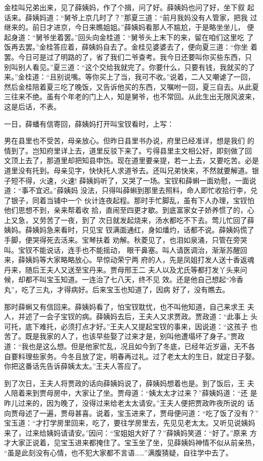 金桂叫兄弟出来，见了薛姨妈，作了个揖，问了好。薛姨妈也问了好，坐下叙
起话来。薛姨妈道：“舅爷上京几时了？”那夏三道：“前月我妈没有人管家，把我
过继来的。前日才进京，今日来瞧姐姐。”薛姨妈看那人不尴尬，于是略坐坐儿，
便起身道：“舅爷坐着罢。”回头向金桂道：“舅爷头上末下的来，留在咱们这里吃
了饭再去罢。”金桂答应着，薛姨妈自去了。金桂见婆婆去了，便向夏三道：“你坐
着罢。今日可是过了明路的了，省了我们二爷查考。我今日还要叫你买些东西，只
别叫别人看见。”夏三道：“这个交给我就完了。你要什么，只要有钱，我就买的了
来。”金桂道：“且别说嘴。等你买上了当，我可不收。”说着，二人又嘲谑了一回，
然后金桂陪着夏三吃了晚饭，又告诉他买的东西，又嘱咐一回，夏三自去。从此夏
三往来不绝。虽有个年老的门上人，知是舅爷，也不常回。从此生出无限风波来，
这是后话，不表。

一日，薛蟠有信寄回，薛姨妈打开叫宝钗看时，上写：

男在县里也不受苦，母亲放心。但昨日县里书办说，府里已经准详，想是我们
的情到了。岂知府里详上去，道里反驳下来了。亏得县里主文相公好，即刻做了回
文顶上去了，那道里却把知县申饬。现在道里要亲提，若一上去，又要吃苦。必是
道里没有托到。母亲见字，快快托人求道爷去。还叫兄弟快来，不然就要解道。银
子短不得，火速，火速!
薛姨妈听了，又哭了一场。宝钗和薛蝌一面劝慰，一面说道：“事不宜迟。”薛姨妈
没法，只得叫薛蝌到那里去照料，命人即忙收拾行李，兑了银子，同着当铺中一个
伙计连夜起程。那时手忙脚乱，虽有下人办理，宝钗怕他们思想不到，亲来帮着收
拾，直闹至四更才歇。到底富家女子娇养惯了的，心上又急，又劳苦了一夜，到了
次日就发起烧来，汤水都吃不下去。莺儿忙回了薛姨妈。薛姨妈急来看时，只见宝
钗满面通红，身如燔灼，话都不说。薛姨妈慌了手脚，便哭得死去活来。宝琴扶着
劝解。秋菱见了，也泪如泉涌，只管在旁哭叫。宝钗不能说话，连手也不能摇动，
眼干鼻塞。叫人请医调治，渐渐苏醒回来，薛姨妈等大家略略放心。早惊动荣宁两
府的人，先是凤姐打发人送十香返魂丹来，随后王夫人又送至宝丹来。贾母邢王二
夫人以及尤氏等都打发丫头来问候，却都不叫宝玉知道。一连治了七八天，终不见
效。还是他自己想起“冷香丸”，吃了三丸，才得病好。后来宝玉也知道了，因病
好了，没有瞧去。

那时薛蝌又有信回来。薛姨妈看了，怕宝钗耽忧，也不叫他知道，自己来求王
夫人，并述了一会子宝钗的病。薛姨妈去后，王夫人又求贾政。贾政道：“此事上
头可托，底下难托，必须打点才好。”王夫人又提起宝钗的事来，因说道：“这孩子
也苦了。既是我家的人了，也该早些娶了过来才是，别叫他遭塌坏了身子。”贾政
道：“我也是这么想。但是他家忙乱，况且如今到了冬底，已经年近岁逼，无不各
自要料理些家务。今冬且放了定，明春再过礼。过了老太太的生日，就定日子娶。
你把这番话先告诉薛姨太太。”王夫人答应了。

到了次日，王夫人将贾政的话向薛姨妈说了，薛姨妈想着也是。到了饭后，王
夫人陪着来到贾母房中，大家让了坐。贾母道：“姨太太才过来？”薛姨妈道：“还
是昨儿过来的，因为晚了，没得过来给老太太请安。”王夫人便把贾政昨夜所说的
话向贾母述了一遍，贾母甚喜。说着，宝玉进来了，贾母便问道：“吃了饭了没有？”
宝玉道：“才打学房里回来，吃了，要往学房里去，先见见老太太。又听见说姨妈
来了，过来给姨妈请请安。”因问：“宝姐姐大好了？”薛姨妈笑道：“好了。”原来
方才大家正说着，见宝玉进来都掩住了。宝玉坐了坐，见薛姨妈神情不似从前亲热，
“虽是此刻没有心情，也不犯大家都不言语……”满腹猜疑，自往学中去了。

